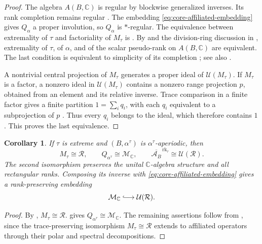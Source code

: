 \documentclass[11pt]{amsart}
\DeclareMathOperator{\rk}{rk}
\newtheorem{corollary}[theorem]{Corollary}
\theoremstyle{definition}
\theoremstyle{remark}
\begin{document}
\begin{proof}
The algebra $A(B,\mathbb C)$ is regular by blockwise generalized
inverses.  Its rank completion remains regular \cite[Theorem~19.6]{Goodearl1991}.
The embedding \eqref{eq:core-affiliated-embedding} gives $Q_\alpha$
a proper involution, so $Q_\alpha$ is $*$-regular.
The equivalence between extremality of $\tau$ and factoriality of
$M_\tau$ is .
By  and the division-ring discussion in
, extremality of
$\tau$, of $\alpha$, and of the scalar pseudo-rank on $A(B,\mathbb C)$ are
equivalent.  The last condition is equivalent to simplicity of its
completion \cite[Theorem~19.14]{Goodearl1991}; see also
\cite[Section~2]{AraClaramunt2018}.

A nontrivial central projection of $M_\tau$ generates a proper ideal
of $\mathcal U(M_\tau)$.  If $M_\tau$ is a factor, a nonzero ideal in
$\mathcal U(M_\tau)$ contains a nonzero range projection $p$, obtained
from an element and its relative inverse.  Trace comparison in a finite
factor gives a finite partition $1=\sum_iq_i$, with each $q_i$ equivalent
to a subprojection of $p$ \cite{MurrayVonNeumann1943}.
Thus every $q_i$ belongs to the ideal, which therefore contains $1$.
This proves the last equivalence.
\end{proof}

\begin{corollary}
\label{cor:parallel-completions}
If $\tau$ is extreme and $(B,\alpha^\tau)$ is $\alpha^\tau$-aperiodic, then
\begin{equation}\label{eq:parallel-completions}
 M_\tau\cong\mathcal R,\qquad Q_{\alpha^\tau}\cong\mathcal M_{\mathbb C},\qquad
 \overline{\mathcal A_B}^{\,\rk_\tau}\cong\mathcal U(\mathcal R).
\end{equation}
The second isomorphism preserves the unital $\mathbb C$-algebra structure
and all rectangular ranks.  Composing its inverse with
\eqref{eq:core-affiliated-embedding} gives a rank-preserving embedding
\begin{equation}\label{eq:continuous-ring-affiliated-embedding}
 \mathcal M_{\mathbb C}\lhook\joinrel\longrightarrow\mathcal U(\mathcal R).
\end{equation}
\end{corollary}

\begin{proof}
By , $M_\tau\cong\mathcal R$.
 gives $Q_{\alpha^\tau}\cong\mathcal M_{\mathbb C}$.
The remaining assertions follow from
, since the
trace-preserving isomorphism $M_\tau\cong\mathcal R$ extends to
affiliated operators through their polar and spectral decompositions.
\end{proof}
\end{document}
